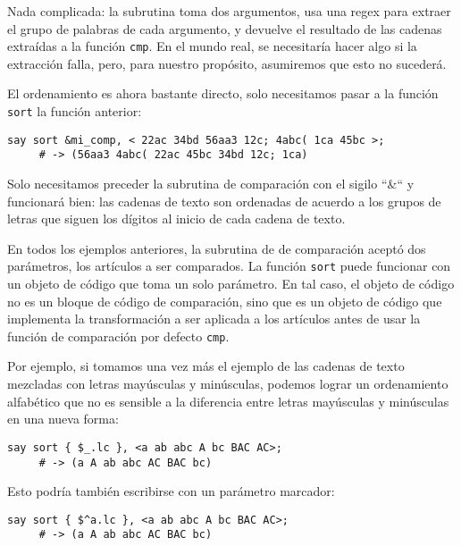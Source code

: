 Nada complicada: la subrutina toma dos argumentos, usa
una regex para extraer el grupo de palabras de cada 
argumento, y devuelve el resultado de las cadenas 
extraídas a la función {\tt cmp}. En el mundo real,
se necesitaría hacer algo si la extracción falla, pero,
para nuestro propósito, asumiremos que esto no sucederá.

El ordenamiento es ahora bastante directo, solo 
necesitamos pasar a la función {\tt sort} la
función anterior:

\begin{verbatim}
say sort &mi_comp, < 22ac 34bd 56aa3 12c; 4abc( 1ca 45bc >;
     # -> (56aa3 4abc( 22ac 45bc 34bd 12c; 1ca)
\end{verbatim}

Solo necesitamos preceder la subrutina de comparación
con el sigilo ``\&`` y funcionará bien: las cadenas de texto
son ordenadas de acuerdo a los grupos de letras que siguen los
dígitos al inicio de cada cadena de texto.

En todos los ejemplos anteriores, la subrutina de
de comparación aceptó dos parámetros, los artículos
a ser comparados. La función {\tt sort} puede funcionar
con un objeto de código que toma un solo parámetro. En 
tal caso, el objeto de código no es un bloque 
de código de comparación, sino que es un objeto de código
que implementa la transformación a ser aplicada a los
artículos antes de usar la función de comparación por
defecto {\tt cmp}. 

Por ejemplo, si tomamos una vez más el ejemplo de las cadenas
de texto mezcladas con letras mayúsculas y minúsculas, 
podemos lograr un ordenamiento alfabético que no es 
sensible a la diferencia entre letras mayúsculas y minúsculas
en una nueva forma:

\begin{verbatim}
say sort { $_.lc }, <a ab abc A bc BAC AC>;
     # -> (a A ab abc AC BAC bc)
\end{verbatim}

Esto podría también escribirse con un parámetro marcador:

\begin{verbatim}
say sort { $^a.lc }, <a ab abc A bc BAC AC>;
     # -> (a A ab abc AC BAC bc)
\end{verbatim}


